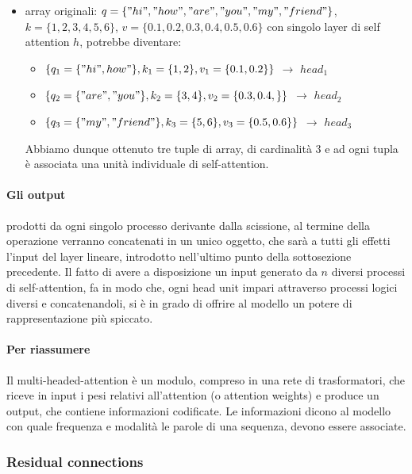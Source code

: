 \begin{itemize}
	\item array originali: $q=\{"hi", "how", "are", "you", "my", "friend"\}$, $k=\{1, 2, 3, 4, 5, 6\}$, $v=\{0.1, 0.2, 0.3, 0.4, 0.5, 0.6\}$ con singolo layer di self attention $h$, potrebbe diventare:
	\begin{itemize}
		\item $\{q_1 = \{"hi", how"\}, k_1=\{1, 2\}, v_1=\{0.1, 0.2\}\}$ $\rightarrow$ $head_1$
		\item $\{q_2 = \{"are", "you"\}, k_2=\{3, 4\}, v_2=\{0.3, 0.4,\}\}$ $\rightarrow$ $head_2$
		\item $\{q_3 = \{"my", "friend"\}, k_3=\{5, 6\}, v_3=\{0.5, 0.6\}\}$ $\rightarrow$ $head_3$
	\end{itemize}
	Abbiamo dunque ottenuto tre tuple di array, di cardinalità 3 e ad ogni tupla è associata una unità individuale di self-attention.
\end{itemize}

\newpage

\paragraph{Gli output} prodotti da ogni singolo processo derivante dalla scissione, al termine della operazione verranno concatenati in un unico oggetto, che sarà a tutti gli effetti l'input del layer lineare, introdotto nell'ultimo punto della sottosezione precedente. Il fatto di avere a disposizione un input generato da $n$ diversi processi di self-attention, fa in modo che, ogni head unit impari attraverso processi logici diversi e concatenandoli, si è in grado di offrire al modello un potere di rappresentazione più spiccato. 

\paragraph{Per riassumere} Il multi-headed-attention è un modulo, compreso in una rete di trasformatori,  che riceve in input i pesi relativi all'attention (o attention weights)  e produce un output, che contiene informazioni codificate. Le informazioni dicono al modello con quale frequenza e modalità le parole di una sequenza, devono essere associate.

\subsubsection{Residual connections}

